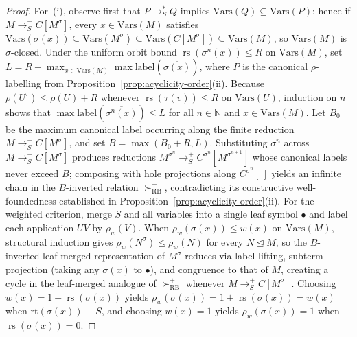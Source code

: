 \documentclass[11pt,reqno]{amsart}
\numberwithin{equation}{section}
\theoremstyle{plain}
\theoremstyle{definition}
\theoremstyle{remark}
\DeclareMathOperator{\rs}{rs}
\newcommand{\redSp}{\to_S^+}
\newcommand{\redSs}{\to_S^*}
\begin{document}
\begin{proof}
For~(i), observe first that $P \redSs Q$ implies $\mathrm{Vars}(Q) \subseteq \mathrm{Vars}(P)$; hence if $M \redSp C[M^\sigma]$, every $x \in \mathrm{Vars}(M)$ satisfies $\mathrm{Vars}(\sigma(x)) \subseteq \mathrm{Vars}(M^\sigma) \subseteq \mathrm{Vars}(C[M^\sigma]) \subseteq \mathrm{Vars}(M)$, so $\mathrm{Vars}(M)$ is $\sigma$-closed. Under the uniform orbit bound $\rs(\sigma^n(x)) \le R$ on $\mathrm{Vars}(M)$, set $L = R + \max_{x \in \mathrm{Vars}(M)} \max\mathrm{label}(\overline{\sigma(x)})$, where $\overline{P}$ is the canonical $\rho$-labelling from Proposition~\ref{prop:acyclicity-order}(ii). Because $\rho(U^\tau) \le \rho(U) + R$ whenever $\rs(\tau(v)) \le R$ on $\mathrm{Vars}(U)$, induction on $n$ shows that $\max\mathrm{label}(\overline{\sigma^n(x)}) \le L$ for all $n \in \mathbb{N}$ and $x \in \mathrm{Vars}(M)$. Let $B_0$ be the maximum canonical label occurring along the finite reduction $M \redSp C[M^\sigma]$, and set $B = \max(B_0 + R, L)$. Substituting $\sigma^n$ across $M \redSp C[M^\sigma]$ produces reductions $M^{\sigma^n} \redSp C^{\sigma^n}[M^{\sigma^{n+1}}]$ whose canonical labels never exceed $B$; composing with hole projections along $C^{\sigma^n}[\,]$ yields an infinite chain in the $B$-inverted relation $\succ_{\mathrm{RB}}^+$, contradicting its constructive well-foundedness established in Proposition~\ref{prop:acyclicity-order}(ii). For the weighted criterion, merge $S$ and all variables into a single leaf symbol $\bullet$ and label each application $U V$ by $\rho_w(V)$. When $\rho_w(\sigma(x)) \le w(x)$ on $\mathrm{Vars}(M)$, structural induction gives $\rho_w(N^\sigma) \le \rho_w(N)$ for every $N \trianglelefteq M$, so the $B$-inverted leaf-merged representation of $M^\sigma$ reduces via label-lifting, subterm projection (taking any $\sigma(x)$ to $\bullet$), and congruence to that of $M$, creating a cycle in the leaf-merged analogue of $\succ_{\mathrm{RB}}^+$ whenever $M \redSp C[M^\sigma]$. Choosing $w(x) = 1 + \rs(\sigma(x))$ yields $\rho_w(\sigma(x)) = 1 + \rs(\sigma(x)) = w(x)$ when $\mathrm{rt}(\sigma(x)) \equiv S$, and choosing $w(x) = 1$ yields $\rho_w(\sigma(x)) = 1$ when $\rs(\sigma(x)) = 0$.


\end{proof}
\end{document}
